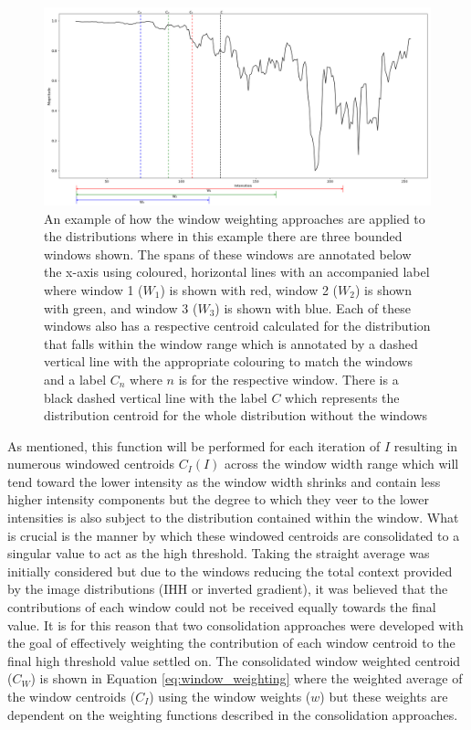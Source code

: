 \begin{figure}
    \centering
    \includegraphics[width=\textwidth]{figs/ch3figs/Windows_overlapping.png}
    \caption[An example of how the window weighting approaches are applied to the distributions]{An example of how the window weighting approaches are applied to the distributions where in this example there are three bounded windows shown. The spans of these windows are annotated below the x-axis using coloured, horizontal lines with an accompanied label where window 1 ($W_1$) is shown with red, window 2 ($W_2$) is shown with green, and window 3 ($W_3$) is shown with blue. Each of these windows also has a respective centroid calculated for the distribution that falls within the window range which is annotated by a dashed vertical line with the appropriate colouring to match the windows and a label $C_n$ where $n$ is for the respective window. There is a black dashed vertical line with the label $C$ which represents the distribution centroid for the whole distribution without the windows}
    \label{fig:window_approach}
\end{figure}
As mentioned, this function will be performed for each iteration of $I$ resulting in numerous windowed centroids $C_I(I)$ across the window width range which will tend toward the lower intensity as the window width shrinks and contain less higher intensity components but the degree to which they veer to the lower intensities is also subject to the distribution contained within the window. What is crucial is the manner by which these windowed centroids are consolidated to a singular value to act as the high threshold. Taking the straight average was initially considered but due to the windows reducing the total context provided by the image distributions (IHH or inverted gradient), it was believed that the contributions of each window could not be received equally towards the final value. It is for this reason that two consolidation approaches were developed with the goal of effectively weighting the contribution of each window centroid to the final high threshold value settled on. The consolidated window weighted centroid ($C_W$) is shown in Equation \ref{eq:window_weighting} where the weighted average of the window centroids ($C_I$) using the window weights ($w$) but these weights are dependent on the weighting functions described in the consolidation approaches.
